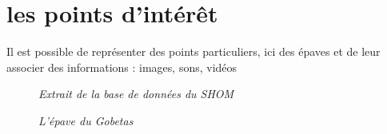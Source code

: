 \section{les points d'intérêt}
Il est possible de représenter des points particuliers, ici des épaves et de leur associer des informations : images, sons, vidéos
\begin{center}
\begin{figure}[ht]
\caption{\label{equiProj}\textit{Extrait de la base de données du SHOM}}
\end{figure}
\end{center}
\begin{center}
\begin{figure}[ht]
\caption{\label{equiProj}\textit{L'épave du Gobetas}}
\end{figure}
\end{center}
\newpage
